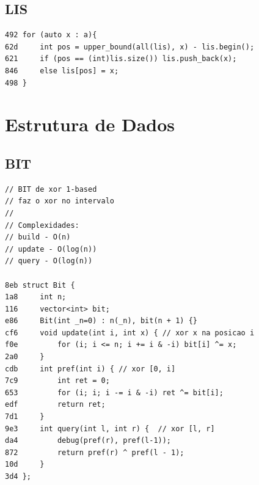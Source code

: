 \documentclass[11pt, a4paper, twoside]{article}
\begin{document}
\subsection{LIS}
\begin{lstlisting}
492 for (auto x : a){
62d     int pos = upper_bound(all(lis), x) - lis.begin();
621     if (pos == (int)lis.size()) lis.push_back(x);
846     else lis[pos] = x;
498 }
\end{lstlisting}



%
%

\section{Estrutura de Dados}

\subsection{BIT}
\begin{lstlisting}
// BIT de xor 1-based
// faz o xor no intervalo
//
// Complexidades:
// build - O(n)
// update - O(log(n))
// query - O(log(n))
 
8eb struct Bit {
1a8 	int n;
116 	vector<int> bit;
e86 	Bit(int _n=0) : n(_n), bit(n + 1) {}
cf6 	void update(int i, int x) { // xor x na posicao i
f0e 		for (i; i <= n; i += i & -i) bit[i] ^= x;
2a0 	}
cdb 	int pref(int i) { // xor [0, i]
7c9 		int ret = 0;
653 		for (i; i; i -= i & -i) ret ^= bit[i];
edf 		return ret;
7d1 	}
9e3 	int query(int l, int r) {  // xor [l, r]
da4         debug(pref(r), pref(l-1));
872 		return pref(r) ^ pref(l - 1); 
10d 	}
3d4 };
\end{lstlisting}
\end{document}
